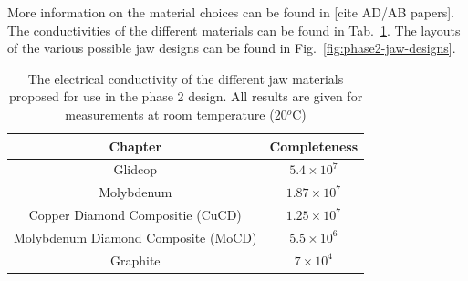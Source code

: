 More information on the material choices can be found in [cite AD/AB papers]. The conductivities of the different materials can be found in Tab.~\ref{tab:phase2-cond}. The layouts of the various possible jaw designs can be found in Fig.~\ref{fig:phase2-jaw-designs}.

\begin{table}
\caption{The electrical conductivity of the different jaw materials proposed for use in the phase 2 design. All results are given for measurements at room temperature (20$^{o}$C)}
\begin{center}
\begin{tabular}{c | c }
Chapter & Completeness \\ \hline
Glidcop & $5.4 \times 10^{7}$ \\ \hline
Molybdenum & $1.87 \times 10^{7}$ \\ \hline
Copper Diamond Compositie (CuCD) & $1.25 \times 10^{7}$ \\ \hline
Molybdenum Diamond Composite (MoCD) & $5.5 \times 10^{6}$ \\ \hline
Graphite & $7 \times 10^{4}$ \\ \hline
\end{tabular}
\end{center}
\label{tab:phase2-cond}
\end{table}

